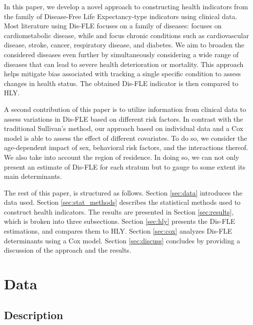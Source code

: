 \documentclass[risks,article,submit,moreauthors,pdftex]{Definitions/mdpi}
\begin{document}
In this paper, we develop a novel approach to constructing health
indicators from the family of Disease-Free Life Expectancy-type
indicators using clinical data. Most literature using Dis-FLE focuses on
a family of diseases: \citet{lagstrom_diet_2020} focuses on
cardiometabolic disease, while \citet{head_socioeconomic_2019} and
\citet{stenholm_body_2017} focus chronic conditions such as
cardiovascular disease, stroke, cancer, respiratory disease, and
diabetes. We aim to broaden the considered diseases even further by
simultaneously considering a wide range of diseases that can lead to
severe health deterioration or mortality. This approach helps mitigate
bias associated with tracking a single specific condition to assess
changes in health status. The obtained Dis-FLE indicator is then
compared to HLY.

A second contribution of this paper is to utilize information from
clinical data to assess variations in Dis-FLE based on different risk
factors. In contrast with the traditional Sullivan's method, our
approach based on individual data and a Cox model is able to assess the
effect of different covariates. To do so, we consider the age-dependent
impact of sex, behavioral risk factors, and the interactions thereof. We
also take into account the region of residence. In doing so, we can not
only present an estimate of Dis-FLE for each stratum but to gauge to
some extent its main determinants.

The rest of this paper, is structured as follows. Section \ref{sec:data}
introduces the data used. Section \ref{sec:stat_methods} describes the
statistical methods used to construct health indicators. The results are
presented in Section \ref{sec:results}, which is broken into three
subsections. Section \ref{sec:hly} presents the Dis-FLE estimations, and
compares them to HLY. Section \ref{sec:cox} analyzes Dis-FLE
determinants using a Cox model. Section \ref{sec:discuss} concludes by
providing a discussion of the approach and the results.

\hypertarget{data}{%
\section{\texorpdfstring{Data \label{sec:data}}{Data }}\label{data}}

\hypertarget{description}{%
\subsection{Description}\label{description}}
\end{document}
